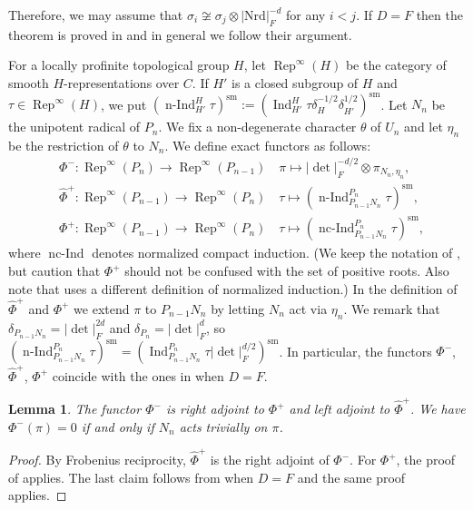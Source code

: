 \documentclass[a4paper]{amsart}
\numberwithin{equation}{section}
\newtheorem{lem}[thm]{Lemma}
\theoremstyle{remark}
\theoremstyle{definition}
\DeclareMathOperator{\Ind}{Ind}
\DeclareMathOperator{\nInd}{n-Ind}
\DeclareMathOperator{\ncInd}{nc-Ind}
\DeclareMathOperator{\Rep}{Rep}
\newcommand{\sm}{\mathrm{sm}}
\newcommand{\Nrd}{\mathrm{Nrd}}
\renewcommand{\simeq}{\cong}
\begin{document}
Therefore, we may assume that $\sigma_{i}\not\simeq\sigma_{j}\otimes\lvert\Nrd\rvert_{F}^{-d}$ for any $i < j$.
If $D = F$ then the theorem is proved in \cite[4.11 Theorem]{MR0579172} and in general we follow their argument.

For a locally profinite topological group $H$, let $\Rep^{\infty}(H)$ be the category of smooth $H$-representations over $C$.
If $H'$ is a closed subgroup of $H$ and $\tau\in\Rep^{\infty}(H)$, we put $(\nInd_{H'}^{H}\tau)^{\sm} := (\Ind_{H'}^{H}\tau\delta_{H}^{-1/2}\delta_{H'}^{1/2})^{\sm}$.
Let $N_{n}$ be the unipotent radical of $P_{n}$.
We fix a non-degenerate character $\theta$ of $U_{n}$ and let $\eta_{n}$ be the restriction of $\theta$ to $N_{n}$.
We define exact functors as follows:
\begin{align*}
& \Phi^{-}\colon \Rep^{\infty}(P_{n})\to \Rep^{\infty}(P_{n - 1})\quad \pi\mapsto \lvert\det\rvert_{F}^{-d/2}\otimes \pi_{N_{n},\eta_{n}},\\
& \widehat{\Phi}^{+}\colon \Rep^{\infty}(P_{n - 1})\to \Rep^{\infty}(P_{n})\quad  \tau\mapsto (\nInd_{P_{n - 1}N_{n}}^{P_{n}}\tau)^\sm,\\
& \Phi^{+}\colon \Rep^{\infty}(P_{n - 1})\to \Rep^{\infty}(P_{n})\quad  \tau\mapsto (\ncInd_{P_{n - 1}N_{n}}^{P_{n}}\tau)^\sm,
\end{align*}
where $\ncInd$ denotes normalized compact induction.
(We keep the notation of \cite{MR0579172}, but caution that $\Phi^{+}$ should not be confused with the set of positive roots. 
Also note that \cite{MR0579172} uses a different definition of normalized induction.)
In the definition of $\widehat{\Phi}^{+}$ and $\Phi^+$ we extend $\pi$ to $P_{n - 1}N_{n}$ by letting $N_{n}$ act via $\eta_n$.
We remark that $\delta_{P_{n - 1}N_{n}} = \lvert\det\rvert_{F}^{2d}$ and $\delta_{P_{n}} = \lvert\det\rvert_{F}^{d}$, so $(\nInd_{P_{n - 1}N_{n}}^{P_{n}}\tau)^{\sm} = (\Ind_{P_{n - 1}N_{n}}^{P_{n}}\tau\lvert\det\rvert_{F}^{d/2})^{\sm}$.
In particular, the functors $\Phi^{-}$, $\widehat{\Phi}^{+}$, $\Phi^{+}$ coincide with the ones in \cite{MR0579172} when $D = F$.

\begin{lem}\label{lem:from BZ}
The functor $\Phi^{-}$ is right adjoint to $\Phi^{+}$ and left adjoint to $\widehat{\Phi}^{+}$.
We have $\Phi^{-}(\pi) = 0$ if and only if $N_{n}$ acts trivially on $\pi$.
\end{lem}
\begin{proof}
By Frobenius reciprocity, $\widehat{\Phi}^{+}$ is the right adjoint of $\Phi^{-}$.
For $\Phi^{+}$, the proof of \cite[3.2 Proposition (b)]{MR0579172} applies.
The last claim follows from \cite[3.2 Proposition (e)]{MR0579172} when $D = F$ and the same proof applies.
\end{proof}
\end{document}
